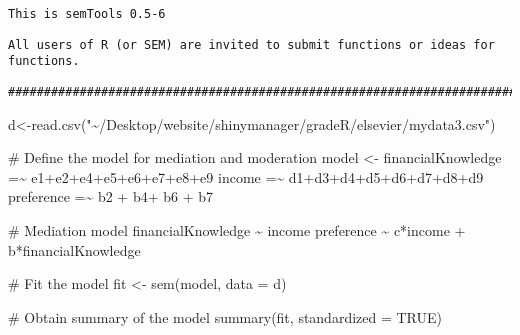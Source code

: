 \documentclass[
  super,
  preprint,
  3p]{elsarticle}
\newenvironment{Shaded}{\begin{snugshade}}{\end{snugshade}}
\newcommand{\AttributeTok}[1]{\textcolor[rgb]{0.40,0.45,0.13}{#1}}
\newcommand{\CommentTok}[1]{\textcolor[rgb]{0.37,0.37,0.37}{#1}}
\newcommand{\ConstantTok}[1]{\textcolor[rgb]{0.56,0.35,0.01}{#1}}
\newcommand{\FunctionTok}[1]{\textcolor[rgb]{0.28,0.35,0.67}{#1}}
\newcommand{\NormalTok}[1]{\textcolor[rgb]{0.00,0.23,0.31}{#1}}
\newcommand{\OtherTok}[1]{\textcolor[rgb]{0.00,0.23,0.31}{#1}}
\newcommand{\StringTok}[1]{\textcolor[rgb]{0.13,0.47,0.30}{#1}}
\begin{document}
\begin{verbatim}
This is semTools 0.5-6
\end{verbatim}

\begin{verbatim}
All users of R (or SEM) are invited to submit functions or ideas for functions.
\end{verbatim}

\begin{verbatim}
###############################################################################
\end{verbatim}

\begin{Shaded}
\begin{Highlighting}[]
\NormalTok{d}\OtherTok{\textless{}{-}}\FunctionTok{read.csv}\NormalTok{(}\StringTok{"\textasciitilde{}/Desktop/website/shinymanager/gradeR/elsevier/mydata3.csv"}\NormalTok{)}

\CommentTok{\# Define the model for mediation and moderation}
\NormalTok{model }\OtherTok{\textless{}{-}} \StringTok{\textquotesingle{}}
\StringTok{  financialKnowledge =\textasciitilde{} e1+e2+e4+e5+e6+e7+e8+e9}
\StringTok{  income =\textasciitilde{} d1+d3+d4+d5+d6+d7+d8+d9}
\StringTok{  preference =\textasciitilde{} b2 + b4+ b6 + b7}

\StringTok{  \# Mediation model}
\StringTok{  financialKnowledge \textasciitilde{} income}
\StringTok{  preference \textasciitilde{} c*income + b*financialKnowledge}
\StringTok{\textquotesingle{}}

\CommentTok{\# Fit the model}
\NormalTok{fit }\OtherTok{\textless{}{-}} \FunctionTok{sem}\NormalTok{(model, }\AttributeTok{data =}\NormalTok{ d)}

\CommentTok{\# Obtain summary of the model}
\FunctionTok{summary}\NormalTok{(fit, }\AttributeTok{standardized =} \ConstantTok{TRUE}\NormalTok{)}
\end{Highlighting}
\end{Shaded}
\end{document}
